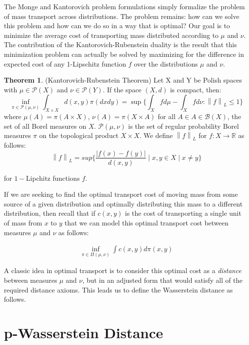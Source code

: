 \documentclass{Dissertate}
\theoremstyle{definition}
\newtheorem{theorem}{Theorem}[section]
\theoremstyle{definition} %
\theoremstyle{definition}
\begin{document}
The Monge and Kantorovich problem formulations simply formalize the problem of mass transport across distributions. The problem remains: how can we solve this problem and how can we do so in a way that is optimal? Our goal is to minimize the average cost of transporting mass distributed according to $\mu$ and $\nu$. The contribution of the Kantorovich-Rubenstein duality is the result that this minimization problem can actually be solved by maximizing for the difference in expected cost of any 1-Lipschitz function $f$ over the distributions $\mu$ and $\nu$. 


\begin{theorem} (Kantorovich-Rubenstein Theorem) \cite{lecturesOT}
Let X and Y be Polish spaces with $\mu \in \mathcal{P}(X)$ and $\nu \in \mathcal{P}(Y)$. If the space $(X,d)$ is compact, then: 
$$
\inf_{\pi \in \mathcal{P(\mu, \nu)}} \int_{X \times X} d(x,y) \pi(dx dy) = \sup \{ \int_X f d\mu - \int_X f d\nu : \left \| f \right \|_L \leq 1\}
$$
where $\mu(A) = \pi(A \times X)$, $\nu(A) = \pi(X \times A)$ for all $A \in A \in \mathcal{B}(X)$, the set of all Borel measures on $X$. $\mathcal{P}(\mu, \nu)$ is the set of regular probability Borel measures $\pi$ on the topological product $X \times X$. We define $\left \| f \right \|_L$ for $f: X \rightarrow \mathbb{R}$ as follows: 
$$
\left \| f \right \|_L = sup\{ \frac{|f(x) - f(y)|}{d(x,y)} \mid x,y \in X \mid  x \neq y\}
$$
\end{theorem}
for $1-$Lipchitz functions $f$. 

If we are seeking to find the optimal transport cost of moving mass from some source of a given distribution and optimally distributing this mass to a different distribution, then recall that if $c(x,y)$ is the cost of transporting a single unit of mass from $x$ to $y$ that we can model this optimal transport cost between measures $\mu$ and $\nu$ as follows: 

\begin{align*}
    \inf_{\pi \in \Pi (\mu, \nu)} \int c(x,y) d\pi (x,y)
\end{align*}

A classic idea in optimal transport is to consider this optimal cost as a \textit{distance}  between measures $\mu$ and $\nu$, but in an adjusted form that would satisfy all of the required distance axioms. This leads us to define the Wasserstein distance as follows. 

\section*{p-Wasserstein Distance}
\end{document}
